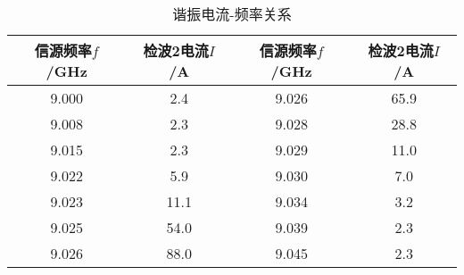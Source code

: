 \begin{table}[htbp!]
	\centering
	\caption{谐振电流-频率关系}\label{tab:I2f}	\begin{tabular}{c||c|c|c}
		\hline\hline
		信源频率$f$/GHz & 检波2电流$I$/A & 信源频率$f$/GHz & 检波2电流$I$/A\\		\hline\hline
		9.000 & 2.4 & 9.026 & 65.9\\		\hline
		9.008 & 2.3 & 9.028 & 28.8\\		\hline
		9.015 & 2.3 & 9.029 & 11.0\\		\hline
		9.022 & 5.9 & 9.030 & 7.0\\		\hline
		9.023 & 11.1 & 9.034 & 3.2\\		\hline
		9.025 & 54.0 & 9.039 & 2.3\\		\hline
		9.026 & 88.0 & 9.045 & 2.3\\		\hline\hline
	\end{tabular}
\end{table}